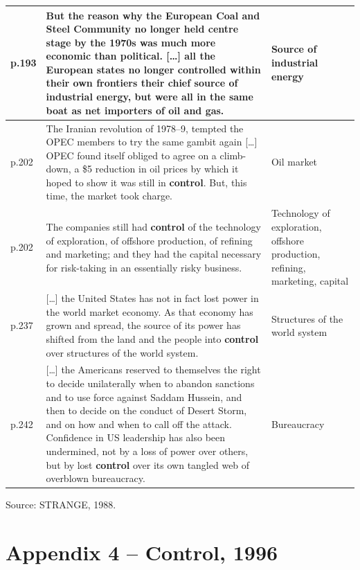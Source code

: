 \begin{longtable}{p{1.2cm} p{9.5cm} p{3.2cm}}
p.193 & But the reason why the European Coal and Steel Community no longer held centre stage by the 1970s was much more economic than political. {[}\ldots{]} all the European states no longer \textbf{controlled} within their own frontiers their chief source of industrial energy, but were all in the same boat as net importers of oil and gas. & Source of industrial energy \\
\midrule

p.202 & The Iranian revolution of 1978--9, tempted the OPEC members to try the same gambit again {[}\ldots{]} OPEC found itself obliged to agree on a climb-down, a \$5 reduction in oil prices by which it hoped to show it was still in \textbf{control}. But, this time, the market took charge. & Oil market \\
\midrule

p.202 & The companies still had \textbf{control} of the technology of exploration, of offshore production, of refining and marketing; and they had the capital necessary for risk-taking in an essentially risky business. & Technology of exploration, offshore production, refining, marketing, capital \\
\midrule

p.237 & {[}\ldots{]} the United States has not in fact lost power in the world market economy. As that economy has grown and spread, the source of its power has shifted from the land and the people into \textbf{control} over structures of the world system. & Structures of the world system \\
\midrule

p.242 & {[}\ldots{]} the Americans reserved to themselves the right to decide unilaterally when to abandon sanctions and to use force against Saddam Hussein, and then to decide on the conduct of Desert Storm, and on how and when to call off the attack. Confidence in US leadership has also been undermined, not by a loss of power over others, but by lost \textbf{control} over its own tangled web of overblown bureaucracy. & Bureaucracy \\
\bottomrule
\end{longtable}

\noindent Source: STRANGE, 1988.

\normalsize

\section*{Appendix 4 -- Control, 1996}

